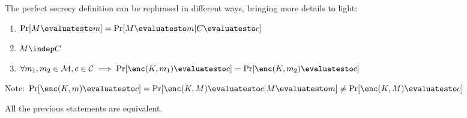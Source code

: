 The perfect secrecy definition can be rephrased in different ways, bringing more details to light:
\begin{enumerate}
    \item $\Pr[M \evaluatesto m] = \Pr[M \evaluatesto m|C \evaluatesto c]$
    \item $M \indep C$
    \item $\forall m_1, m_2 \in \M, c \in \C \implies \Pr[\enc(K, m_1) \evaluatesto c] = \Pr[\enc(K, m_2) \evaluatesto c]$
\end{enumerate}

Note: $\Pr[\enc(K, m) \evaluatesto c] = \Pr[\enc(K, M) \evaluatesto c | M \evaluatesto m] \neq \Pr[\enc(K, M) \evaluatesto c]$
    
\begin{proposition}
    All the previous statements are equivalent.
\end{proposition}

